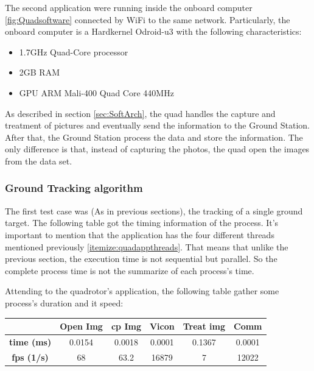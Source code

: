	The second application were running inside the onboard computer \ref{fig:Quadsoftware} connected by WiFi to the same network. Particularly, the onboard computer is a Hardkernel Odroid-u3 with the following characteristics:
	
	
	\begin{itemize}
		\item 1.7GHz Quad-Core processor 
		\item 2GB RAM
		\item GPU ARM Mali-400 Quad Core 440MHz  
	\end{itemize}
	
	As described in section \ref{sec:SoftArch}, the quad handles the capture and treatment of pictures and eventually send the information to the Ground Station. After that, the Ground Station process the data and store the information. The only difference is that, instead of capturing the photos, the quad open the images from the data set.
	
	
	\subsubsection{Ground Tracking algorithm}
	
	The first test case was (As in previous sections), the tracking of a single ground target. The following table got the timing information of the process. It's important to mention that the application has the four different threads mentioned previously \ref{itemize:quadappthreads}. That means that unlike the previous section, the execution time is not sequential but parallel. So the complete process time is not the summarize of each process's time.
	
	Attending to the quadrotor's application, the following table gather some process's duration and it speed:
	\newline
	\newline
	{
	\centering
		\begin{tabular}{|c|c|c|c|c|c|}
		\hline  					&  Open Img	&  cp Img 	& Vicon 	& Treat img & Comm  		\\ 
		\hline  \textbf{time (ms)}	& 	0.0154	& 0.0018	&	0.0001	&  	 0.1367	&	0.0001		\\ 
		\hline  \textbf{fps (1/s)}	&  	68		&  63.2		&  16879	&  	7		&	12022		\\ 
		\hline 
		\end{tabular} 
	}
	\newline
	
